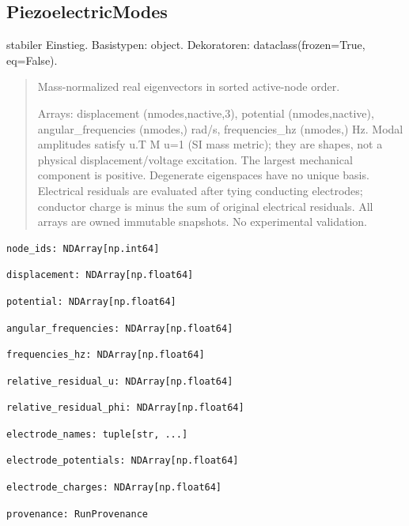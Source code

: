 \subsection{PiezoelectricModes}
stabiler Einstieg.
Basistypen: object. Dekoratoren: dataclass(frozen=True, eq=False).
\begin{quote}
Mass-normalized real eigenvectors in sorted active-node order.\par Arrays: displacement (nmodes,nactive,3), potential (nmodes,nactive), angular\_frequencies (nmodes,) rad/s, frequencies\_hz (nmodes,) Hz. Modal amplitudes satisfy u.T M u=1 (SI mass metric); they are shapes, not a physical displacement/voltage excitation. The largest mechanical component is positive. Degenerate eigenspaces have no unique basis. Electrical residuals are evaluated after tying conducting electrodes; conductor charge is minus the sum of original electrical residuals. All arrays are owned immutable snapshots. No experimental validation.
\end{quote}
\begin{lstlisting}
node_ids: NDArray[np.int64]
\end{lstlisting}
\begin{lstlisting}
displacement: NDArray[np.float64]
\end{lstlisting}
\begin{lstlisting}
potential: NDArray[np.float64]
\end{lstlisting}
\begin{lstlisting}
angular_frequencies: NDArray[np.float64]
\end{lstlisting}
\begin{lstlisting}
frequencies_hz: NDArray[np.float64]
\end{lstlisting}
\begin{lstlisting}
relative_residual_u: NDArray[np.float64]
\end{lstlisting}
\begin{lstlisting}
relative_residual_phi: NDArray[np.float64]
\end{lstlisting}
\begin{lstlisting}
electrode_names: tuple[str, ...]
\end{lstlisting}
\begin{lstlisting}
electrode_potentials: NDArray[np.float64]
\end{lstlisting}
\begin{lstlisting}
electrode_charges: NDArray[np.float64]
\end{lstlisting}
\begin{lstlisting}
provenance: RunProvenance
\end{lstlisting}
